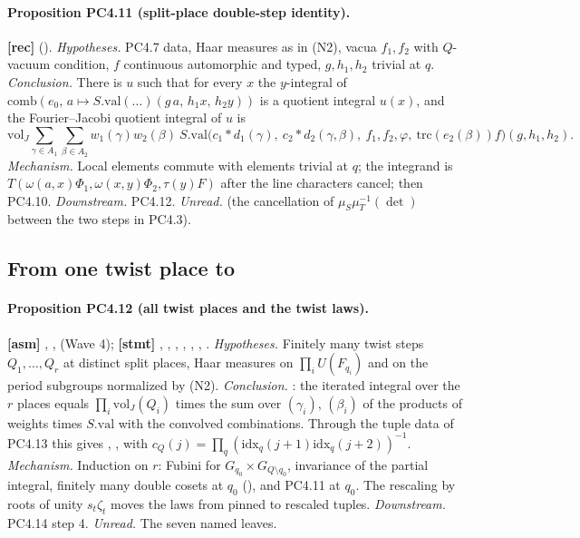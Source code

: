 \documentclass[11pt]{article}
\begin{document}
\paragraph{Proposition PC4.11 (split-place double-step identity).} \textbf{[rec]}  ().
\emph{Hypotheses.} PC4.7 data, Haar measures as in (N2), vacua $f_1,f_2$ with $Q$-vacuum condition, $f$ continuous automorphic and typed, $g,h_1,h_2$ trivial at $q$. \emph{Conclusion.} There is $u$ such that for every $x$ the $y$-integral of $\mathrm{comb}(e_0,\,a\mapsto S.\mathrm{val}(\dots)(g\,a,\,h_1x,\,h_2y))$ is a quotient integral $u(x)$, and the Fourier--Jacobi quotient integral of $u$ is
\[
\mathrm{vol}_J\sum_{\gamma\in A_1}\sum_{\beta\in A_2}w_1(\gamma)w_2(\beta)\ S.\mathrm{val}\bigl(c_1*d_1(\gamma),\ c_2*d_2(\gamma,\beta),\ f_1,f_2,\varphi,\ \mathrm{trc}(e_2(\beta))f\bigr)(g,h_1,h_2).
\]
\emph{Mechanism.} Local elements commute with elements trivial at $q$; the integrand is $T(\omega(a,x)\Phi_1,\omega(x,y)\Phi_2,\tau(y)F)$ after the line characters cancel; then PC4.10. \emph{Downstream.} PC4.12. \emph{Unread.}  (the cancellation of $\mu_S\mu_T^{-1}(\det)$ between the two steps in PC4.3).

\subsection{From one twist place to }

\paragraph{Proposition PC4.12 (all twist places and the twist laws).} \textbf{[asm]} , ,  (Wave 4); \textbf{[stmt]} , , , , , , .
\emph{Hypotheses.} Finitely many twist steps $Q_1,\dots,Q_r$ at distinct split places, Haar measures on $\prod_iU(F_{q_i})$ and on the period subgroups normalized by (N2). \emph{Conclusion.} : the iterated integral over the $r$ places equals $\prod_i\mathrm{vol}_J(Q_i)$ times the sum over $(\gamma_i)$, $(\beta_i)$ of the products of weights times $S.\mathrm{val}$ with the convolved combinations. Through the tuple data of PC4.13 this gives , ,  with $c_Q(j)=\prod_q(\mathrm{idx}_q(j+1)\mathrm{idx}_q(j+2))^{-1}$. \emph{Mechanism.} Induction on $r$: Fubini for $G_{q_0}\times G_{Q\setminus q_0}$, invariance of the partial integral, finitely many double cosets at $q_0$ (), and PC4.11 at $q_0$. The rescaling by roots of unity $s_t\zeta_t$ moves the laws from pinned to rescaled tuples. \emph{Downstream.} PC4.14 step 4. \emph{Unread.} The seven named leaves.
\end{document}
